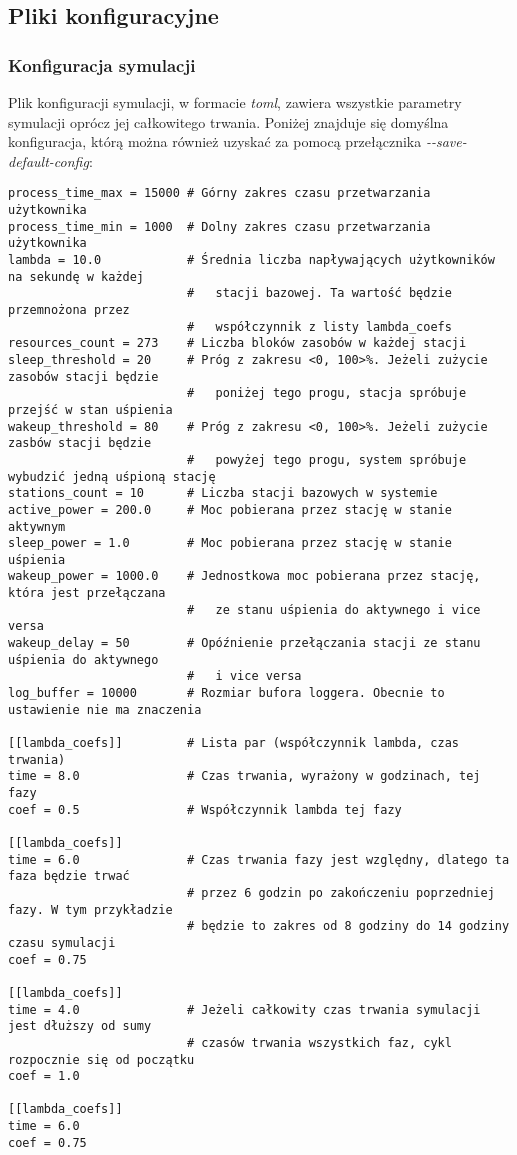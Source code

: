 \subsection{Pliki konfiguracyjne}
\subsubsection{Konfiguracja symulacji}
Plik konfiguracji symulacji, w formacie \emph{toml}, zawiera wszystkie parametry symulacji oprócz jej całkowitego trwania. Poniżej znajduje się domyślna konfiguracja, którą można również uzyskać za pomocą przełącznika \emph{-{}-save-default-config}:

{
\selectfont 
\begin{verbatim}
process_time_max = 15000 # Górny zakres czasu przetwarzania użytkownika
process_time_min = 1000  # Dolny zakres czasu przetwarzania użytkownika
lambda = 10.0            # Średnia liczba napływających użytkowników na sekundę w każdej
                         #   stacji bazowej. Ta wartość będzie przemnożona przez
                         #   współczynnik z listy lambda_coefs
resources_count = 273    # Liczba bloków zasobów w każdej stacji
sleep_threshold = 20     # Próg z zakresu <0, 100>%. Jeżeli zużycie zasobów stacji będzie
                         #   poniżej tego progu, stacja spróbuje przejść w stan uśpienia
wakeup_threshold = 80    # Próg z zakresu <0, 100>%. Jeżeli zużycie zasbów stacji będzie
                         #   powyżej tego progu, system spróbuje wybudzić jedną uśpioną stację
stations_count = 10      # Liczba stacji bazowych w systemie
active_power = 200.0     # Moc pobierana przez stację w stanie aktywnym
sleep_power = 1.0        # Moc pobierana przez stację w stanie uśpienia
wakeup_power = 1000.0    # Jednostkowa moc pobierana przez stację, która jest przełączana
                         #   ze stanu uśpienia do aktywnego i vice versa
wakeup_delay = 50        # Opóźnienie przełączania stacji ze stanu uśpienia do aktywnego
                         #   i vice versa
log_buffer = 10000       # Rozmiar bufora loggera. Obecnie to ustawienie nie ma znaczenia

[[lambda_coefs]]         # Lista par (współczynnik lambda, czas trwania)
time = 8.0               # Czas trwania, wyrażony w godzinach, tej fazy
coef = 0.5               # Współczynnik lambda tej fazy

[[lambda_coefs]]
time = 6.0               # Czas trwania fazy jest względny, dlatego ta faza będzie trwać
                         # przez 6 godzin po zakończeniu poprzedniej fazy. W tym przykładzie
                         # będzie to zakres od 8 godziny do 14 godziny czasu symulacji
coef = 0.75

[[lambda_coefs]]
time = 4.0               # Jeżeli całkowity czas trwania symulacji jest dłuższy od sumy
                         # czasów trwania wszystkich faz, cykl rozpocznie się od początku
coef = 1.0

[[lambda_coefs]]
time = 6.0
coef = 0.75
\end{verbatim}
}


